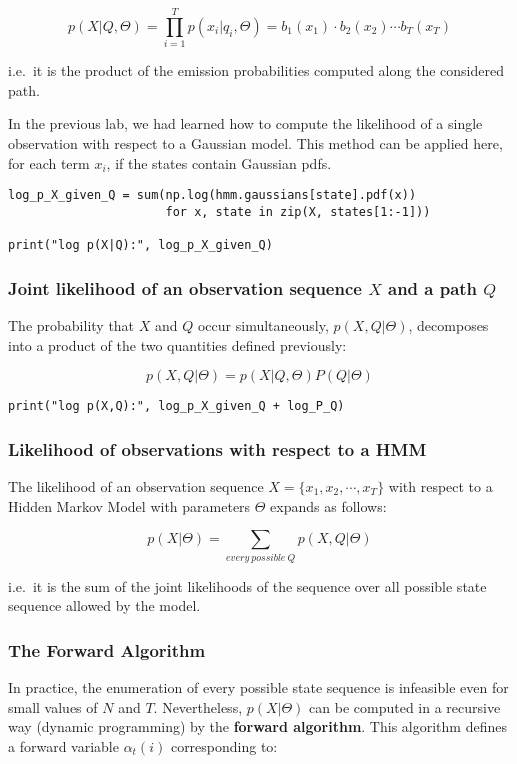 \documentclass[11pt]{article}
\begin{document}
$$
p(X|Q,\Theta) = \prod_{i=1}^T p(x_i|q_i,\Theta)
= b_1(x_1) \cdot b_2(x_2) \cdots b_T(x_T)
$$

\noindent
i.e. it is the product of the emission probabilities computed along
the considered path.

In the previous lab, we had learned how to compute the likelihood of a
single observation with respect to a Gaussian model. This method can be
applied here, for each term \(x_i\), if the states contain Gaussian pdfs.

\begin{verbatim}
log_p_X_given_Q = sum(np.log(hmm.gaussians[state].pdf(x))
                      for x, state in zip(X, states[1:-1]))

print("log p(X|Q):", log_p_X_given_Q)
\end{verbatim}

\subsubsection{Joint likelihood of an observation sequence \(X\) and a path \(Q\)}
\label{sec:orgf2eddd0}
The probability that \(X\) and \(Q\) occur simultaneously, \(p(X,Q|\Theta)\),
decomposes into a product of the two quantities defined previously:

$$
p(X,Q|\Theta) = p(X|Q,\Theta) P(Q|\Theta)
$$

\begin{verbatim}
print("log p(X,Q):", log_p_X_given_Q + log_P_Q)
\end{verbatim}

\subsubsection{Likelihood of observations with respect to a HMM}
\label{sec:orged15d82}
The likelihood of an observation sequence \(X=\{x_1,x_2,\cdots,x_T\}\)
with respect to a Hidden Markov Model with parameters \(\Theta\) expands
as follows:

$$
    p(X|\Theta) = \sum_{every~possible~Q} p(X,Q|\Theta)
$$

\noindent
i.e. it is the sum of the joint likelihoods of the sequence over all
possible state sequence allowed by the model.

\subsubsection{The Forward Algorithm}
\label{sec:org41a9d6f}
In practice, the enumeration of every possible state sequence is
infeasible even for small values of \(N\) and \(T\). Nevertheless,
\(p(X|\Theta)\) can be computed in a recursive way (dynamic programming)
by the \textbf{forward algorithm}. This algorithm defines a forward variable
\(\alpha_t(i)\) corresponding to:
\end{document}
